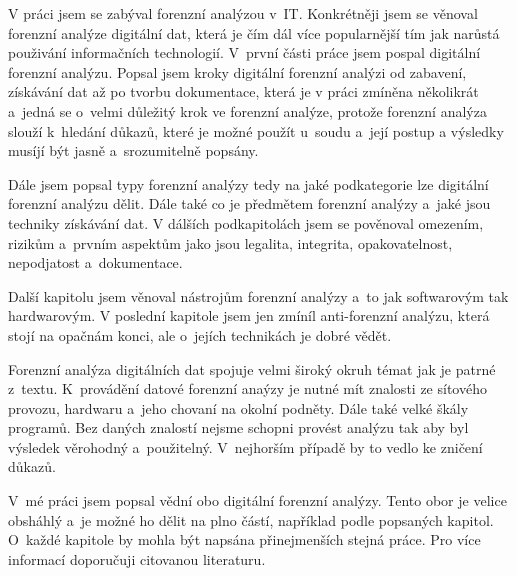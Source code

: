 \documentclass[thesis=B,czech]{FITthesis}[2012/06/26]
\begin{document}
\begin{conclusion}
V práci jsem se zabýval forenzní analýzou v~IT. Konkrétněji jsem se věnoval forenzní analýze digitální dat, která je čím dál více popularnější tím jak narůstá použivání informačních technologií. V~první části práce jsem pospal digitální forenzní analýzu. Popsal jsem kroky digitální forenzní analýzi od zabavení, získávání dat až po tvorbu dokumentace, která je v práci zmíněna několikrát a~jedná se o~velmi důležitý krok ve forenzní analýze, protože forenzní analýza slouží k~hledání důkazů, které je možné použít u~soudu a~její postup a výsledky musíjí být jasně a~srozumitelně popsány. 

Dále jsem popsal typy forenzní analýzy tedy na jaké podkategorie lze digitální forenzní analýzu dělit. Dále také co je předmětem forenzní analýzy a~jaké jsou techniky získávání dat. V dálších podkapitolách jsem se pověnoval omezením, rizikům a~prvním aspektům jako jsou legalita, integrita, opakovatelnost, nepodjatost a~dokumentace. 

Další kapitolu jsem věnoval nástrojům forenzní analýzy a~to jak softwarovým tak hardwarovým. V poslední kapitole jsem jen zmíníl anti-forenzní analýzu, která stojí na opačnám konci, ale o~jejích technikách je dobré vědět. 

Forenzní analýza digitálních dat spojuje velmi široký okruh témat jak je patrné z~textu. K~provádění datové forenzní anaýzy je nutné mít znalosti ze sítového provozu, hardwaru a~jeho chovaní na okolní podněty. Dále také velké škály programů. Bez daných znalostí nejsme schopni provést analýzu tak aby byl výsledek věrohodný a~použitelný. V~nejhorším případě by to vedlo ke zničení důkazů. 

V~mé práci jsem popsal vědní obo digitální forenzní analýzy. Tento obor je velice obsháhlý a~je možné ho dělit na plno částí, například podle popsaných kapitol. O~každé kapitole by mohla být napsána přinejmenších stejná práce. Pro více informací doporučuji citovanou literaturu.






\end{conclusion}




\appendix
\end{document}
